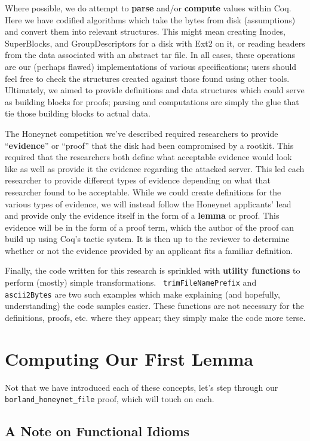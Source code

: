 \documentclass[nocopyrightspace]{sigplanconf}
\begin{document}
Where possible, we do attempt to {\bf parse} and/or {\bf compute} values
within Coq. Here we have codified algorithms which take the bytes from disk
(assumptions) and convert them into relevant structures. This might mean
creating Inodes, SuperBlocks, and GroupDescriptors for a disk with Ext2 on it,
or reading headers from the data associated with an abstract tar file. In all
cases, these operations are our (perhaps flawed) implementations of various
specifications; users should feel free to check the structures created against
those found using other tools. Ultimately, we aimed to provide definitions and
data structures which could serve as building blocks for proofs; parsing and
computations are simply the glue that tie those building blocks to actual
data.

The Honeynet competition we've described required researchers to provide
``{\bf evidence}'' or ``proof'' that the disk had been compromised by a
rootkit. This required that the researchers both define what acceptable
evidence would look like as well as provide it the evidence regarding the
attacked server. This led each researcher to provide different types of
evidence depending on what that researcher found to be acceptable. While we
could create definitions for the various types of evidence, we will instead
follow the Honeynet applicants' lead and provide only the evidence itself in
the form of a {\bf lemma} or proof. This evidence will be in the form of a
proof term, which the author of the proof can build up using Coq's tactic
system. It is then up to the reviewer to determine whether or not the evidence
provided by an applicant fits a familiar definition.

Finally, the code written for this research is sprinkled with {\bf utility
functions} to perform (mostly) simple transformations. {\tt
trimFileNamePrefix} and {\tt ascii2Bytes} are two such examples which make
explaining (and hopefully, understanding) the code samples easier. These
functions are not necessary for the definitions, proofs, etc. where they
appear; they simply make the code more terse.

\section{Computing Our First Lemma}

Not that we have introduced each of these concepts, let's step through our
{\tt borland\_honeynet\_file} proof, which will touch on each.

\subsection{A Note on Functional Idioms}
\end{document}

